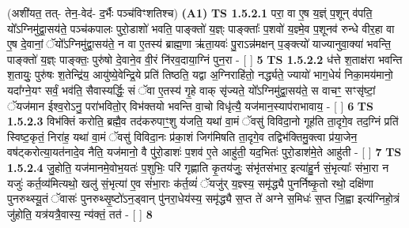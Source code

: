 \documentclass[17pt]{extarticle}
\begin{document}
                  \newline
                      (अशी॑यत॒ तत्- तेन॒-वेद॑- द॒र्भैः पञ्च॑विꣳशतिश्च)  \textbf{(A1)} \newline \newline
                                        \textbf{ TS 1.5.2.1} \newline
                  परा॒ वा ए॒ष य॒ज्ञ्ं प॒शून् व॑पति॒ यो᳚ऽग्निमु॑द्वा॒सय॑ते॒ पञ्च॑कपालः पुरो॒डाशो॑ भवति॒ पाङ्क्तो॑ य॒ज्ञ्ः पाङ्क्ताः᳚ प॒शवो॑ य॒ज्ञ्मे॒व प॒शूनव॑ रुन्धे वीर॒हा वा ए॒ष दे॒वानां॒ ॅयो᳚ऽग्निमु॑द्वा॒सय॑ते॒ न वा ए॒तस्य॑ ब्राह्म॒णा ऋ॑ता॒यवः॑ पु॒राऽन्न॑मक्षन् प॒ङ्क्त्यो॑ याज्यानुवा॒क्या॑ भवन्ति॒ पाङ्क्तो॑ य॒ज्ञ्ः पाङ्क्तः॒ पुरु॑षो दे॒वाने॒व वी॒रं नि॑रव॒दाया॒ग्निं पुन॒रा - [ ] \textbf{  5} \newline
                  \newline
                                \textbf{ TS 1.5.2.2} \newline
                  ध॑त्ते श॒ताक्ष॑रा भवन्ति श॒तायुः॒ पुरु॑षः श॒तेन्द्रि॑य॒ आयु॑ष्ये॒वेन्द्रि॒ये प्रति॑ तिष्ठति॒ यद्वा अ॒ग्निराहि॑तो॒ नर्द्ध्यते॒ ज्यायो॑ भाग॒धेयं॑ निका॒मय॑मानो॒ यदा᳚ग्ने॒यꣳ सर्वं॒ भव॑ति॒ सैवास्यर्द्धिः॒ सं ॅवा ए॒तस्य॑ गृ॒हे वाक् सृ॑ज्यते॒ यो᳚ऽग्निमु॑द्वा॒सय॑ते॒ स वाचꣳ॒॒ सꣳसृ॑ष्टां॒ ॅयज॑मान ईश्व॒रोऽनु॒ परा॑भवितो॒र् विभ॑क्तयो भवन्ति वा॒चो विधृ॑त्यै॒ यज॑मान॒स्याप॑राभावाय॒ - [ ] \textbf{  6} \newline
                  \newline
                                \textbf{ TS 1.5.2.3} \newline
                  विभ॑क्तिं करोति॒ ब्रह्मै॒व तद॑करुपाꣳ॒॒शु य॑जति॒ यथा॑ वा॒मं ॅवसु॑ विविदा॒नो गूह॑ति ता॒दृगे॒व तद॒ग्निं प्रति॑ स्विष्ट॒कृतं॒ निरा॑ह॒ यथा॑ वा॒मं ॅवसु॑ विविदा॒नः प्र॑का॒शं जिग॑मिषति ता॒दृगे॒व तद्विभ॑क्तिमु॒क्त्वा प्र॑या॒जेन॒ वष॑ट्करोत्या॒यत॑नादे॒व नैति॒ यज॑मानो॒ वै पु॑रो॒डाशः॑ प॒शव॑ ए॒ते आहु॑ती॒ यद॒भितः॑ पुरो॒डाश॑मे॒ते आहु॑ती - [ ] \textbf{  7} \newline
                  \newline
                                \textbf{ TS 1.5.2.4} \newline
                  जु॒होति॒ यज॑मानमे॒वोभ॒यतः॑ प॒शुभिः॒ परि॑ गृह्णाति कृ॒तय॑जुः॒ संभृ॑तसंभार॒ इत्या॑हु॒र्न सं॒भृत्याः᳚ संभा॒रा न यजुः॑ कर्त॒व्य॑मित्यथो॒ खलु॑ सं॒भृत्या॑ ए॒व सं॑भा॒राः क॑र्त॒व्यं॑ ॅयजु॑र् य॒ज्ञ्स्य॒ समृ॑द्ध्यै पुनर्निष्कृ॒तो रथो॒ दक्षि॑णा पुनरुथ्स्यू॒तं ॅवासः॑ पुनरुथ्सृ॒ष्टो॑ऽन॒ड्वान् पु॑नरा॒धेय॑स्य॒ समृ॑द्ध्यै स॒प्त ते॑ अग्ने स॒मिधः॑ स॒प्त जि॒ह्वा इत्य॑ग्निहो॒त्रं जु॑होति॒ यत्र॑यत्रै॒वास्य॒ न्य॑क्तं॒ तत॑ - [ ] \textbf{  8} \newline
\end{document}
